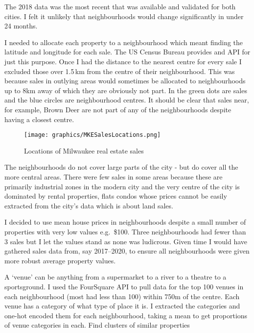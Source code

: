 \documentclass[a4paper,12pt,final,UKenglish]{article}
\begin{document}
            The 2018 data was the most recent that was available and validated for both cities.
            I felt it unlikely that neighbourhoods would change significantly in under 24 months.

            I needed to allocate each property to a neighbourhood which meant finding the latitude and longitude for each sale.
            The US Census Bureau provides and API for just this purpose.
            Once I had the distance to the nearest centre for every sale I excluded those over {1.5\,km} from the centre of their neighbourhood.
            This was because sales in outlying areas would sometimes be allocated to neighbourhoods up to {8km} away of which they are obviously not part.
            In  the green dots are sales and the blue circles are neighbourhood centres.
            It should be clear that sales near, for example, Brown Deer are not part of any of the neighbourhoods despite having a closest centre.
            \begin{figure}[htb]
                \centering
                \texttt{[image: graphics/MKESalesLocations.png]}
                \caption{Locations of Milwaukee real estate sales\label{fig:SalesLocs}}
            \end{figure}
            
            The neighbourhoods do not cover large parts of the city - but do cover all the more central areas.  There were few sales in some areas
            because these are primarily industrial zones in the modern city and the very centre of the city is dominated by rental properties, flats
            condos whose prices cannot be easily extracted from the city's data which is about land sales.
            
            I decided to use mean house prices in neighbourhoods despite a small number of properties with very low values e.g.\ \$100.
            Three neighbourhoods had fewer than 3 sales but I let the values stand as none was ludicrous.
            Given time I would have gathered sales data from, say 2017--2020, to ensure all neighbourhoods were given more robust average property values.
            
            A `venue' can be anything from a supermarket to a river to a theatre to a sportsground.
            I used the FourSquare API to pull data for the top 100 venues in each neighbourhood (most had less than 100) within 750m of the centre.
            Each venue has a category of what type of place it is.
            I extracted the categories and one-hot encoded them for each neighbourhood, taking a mean to get proportions of venue categories in each.
                Find clusters of similar properties
\end{document}
